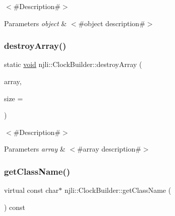 $<$\#\+Description\#$>$


\begin{DoxyParams}{Parameters}
{\em object} & $<$\#object description\#$>$ \\
\hline
\end{DoxyParams}
\mbox{\label{classnjli_1_1_clock_builder_a85dfefe52cf31c7511ba96f128f34131}} 
\subsubsection{\texorpdfstring{destroy\+Array()}{destroyArray()}}
{\footnotesize\ttfamily static \mbox{\hyperlink{_thread_8h_af1e856da2e658414cb2456cb6f7ebc66}{void}} njli\+::\+Clock\+Builder\+::destroy\+Array (\begin{DoxyParamCaption}\item[{\mbox{\hyperlink{classnjli_1_1_clock_builder}{Clock\+Builder}} $\ast$$\ast$}]{array,  }\item[{const \mbox{\hyperlink{_util_8h_a10e94b422ef0c20dcdec20d31a1f5049}{u32}}}]{size = {} }\end{DoxyParamCaption})\hspace{0.3cm}{\ttfamily [static]}}

$<$\#\+Description\#$>$


\begin{DoxyParams}{Parameters}
{\em array} & $<$\#array description\#$>$ \\
\hline
\end{DoxyParams}
\mbox{\label{classnjli_1_1_clock_builder_a535f81dd0c0b3313941d139c96cdb731}} 
\subsubsection{\texorpdfstring{get\+Class\+Name()}{getClassName()}}
{\footnotesize\ttfamily virtual const char$\ast$ njli\+::\+Clock\+Builder\+::get\+Class\+Name (\begin{DoxyParamCaption}{ }\end{DoxyParamCaption}) const\hspace{0.3cm}{\ttfamily [virtual]}}

